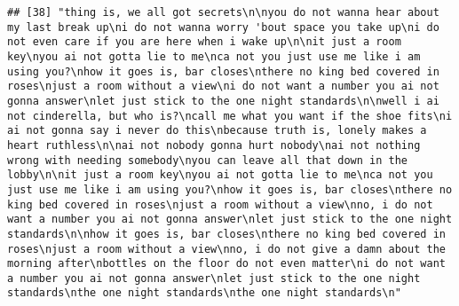 \documentclass[]{article}
\begin{document}
\begin{verbatim}
## [38] "thing is, we all got secrets\n\nyou do not wanna hear about my last break up\ni do not wanna worry 'bout space you take up\ni do not even care if you are here when i wake up\n\nit just a room key\nyou ai not gotta lie to me\nca not you just use me like i am using you?\nhow it goes is, bar closes\nthere no king bed covered in roses\njust a room without a view\ni do not want a number you ai not gonna answer\nlet just stick to the one night standards\n\nwell i ai not cinderella, but who is?\ncall me what you want if the shoe fits\ni ai not gonna say i never do this\nbecause truth is, lonely makes a heart ruthless\n\nai not nobody gonna hurt nobody\nai not nothing wrong with needing somebody\nyou can leave all that down in the lobby\n\nit just a room key\nyou ai not gotta lie to me\nca not you just use me like i am using you?\nhow it goes is, bar closes\nthere no king bed covered in roses\njust a room without a view\nno, i do not want a number you ai not gonna answer\nlet just stick to the one night standards\n\nhow it goes is, bar closes\nthere no king bed covered in roses\njust a room without a view\nno, i do not give a damn about the morning after\nbottles on the floor do not even matter\ni do not want a number you ai not gonna answer\nlet just stick to the one night standards\nthe one night standards\nthe one night standards\n"                                                                                                                                                                                                                                                                                                                                                                                                                                                                                                                                                                                                                                                                                                                                                                                                                                                                                                                                                                                                                                                                                                                                                                                                                                                                                                                                                                                                                                                                                                                                                                             

\end{verbatim}
\end{document}
